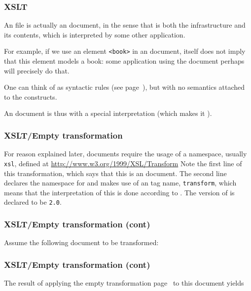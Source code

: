 %
\begin{frame}[containsverbatim]
\frametitle{XSLT}

An \XSLT file is actually an \XML document, in the sense that \XML is
both the infrastructure and its contents, which is interpreted by some
other application.

\bigskip

For example, if we use an element \verb|<book>| in an \XML document,
\XML itself does not imply that this element models a book: some
application using the document perhaps will precisely do that.

\bigskip

One can think of \XML as syntactic rules (see
page~\pageref{well_formedness}), but with no semantics attached to the
constructs.

\bigskip

An \XSLT document is thus \XML with a special interpretation (which
makes it \XSLT).

\end{frame}

%
\begin{frame}
\frametitle{XSLT/Empty transformation}
\label{empty.xsl}

For reason explained later, \XSLT documents require the usage of a
namespace, usually \texttt{xsl}, defined at
{\small \url{http://www.w3.org/1999/XSL/Transform}}
Note the first line of this transformation, which says that this is an
\XML document. The second line declares the namespace for \XSLT and
makes use of an \XSLT tag name, \texttt{transform}, which means that
the interpretation of this \XML is done according to \XSLT. The
version of \XSLT is declared to be \texttt{2.0}.

\end{frame}

%
\begin{frame}
\frametitle{XSLT/Empty transformation (cont)}
\label{cookbook.xml}

Assume the following \XML document to be transformed:

\end{frame}

%
\begin{frame}
\frametitle{XSLT/Empty transformation (cont)}

The result of applying the empty transformation
page~\pageref{empty.xsl} to this document yields

\end{frame}

